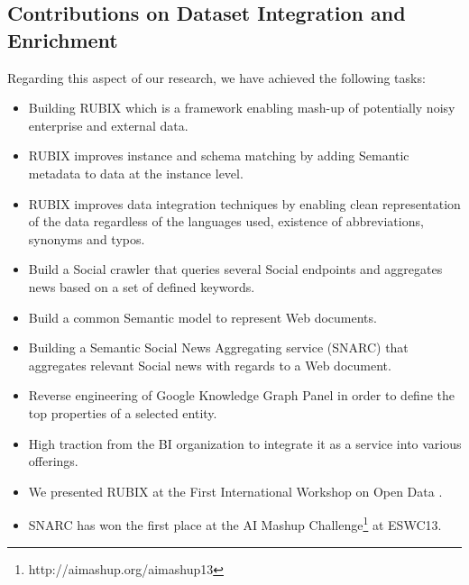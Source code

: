 \documentclass[onecolumn, crcready]{iosart2c}
\begin{document}
\subsection{Contributions on Dataset Integration and Enrichment}
Regarding this aspect of our research, we have achieved the following tasks:
 \begin{itemize}
 \item Building RUBIX which is a framework enabling mash-up of potentially noisy enterprise and external data.
 \item RUBIX improves instance and schema matching by adding Semantic metadata to data at the instance level.
 \item RUBIX improves data integration techniques by enabling clean representation of the data regardless of the languages used, existence of abbreviations, synonyms and typos.
 \item Build a Social crawler that queries several Social endpoints and aggregates news based on a set of defined keywords.
 \item Build a common Semantic model to represent Web documents.
 \item Building a Semantic Social News Aggregating service (SNARC) \cite{DBLP:conf/esws/AssafST13} that aggregates relevant Social news with regards to a Web document.
 \item Reverse engineering of Google Knowledge Graph Panel in order to define the top properties of a selected entity.
 \item High traction from the BI organization to integrate it as a service into various offerings.
 \item We presented RUBIX at the First International Workshop on Open Data \cite{Assaf:2012:RFI:2422604.2422607}\cite{DBLP:journals/corr/abs-1205-2691}.
 \item SNARC has won the first place at the AI Mashup Challenge\footnote{http://aimashup.org/aimashup13} at ESWC13.
\end{itemize}
\end{document}
